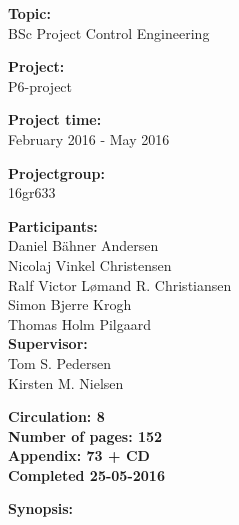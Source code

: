 \begin{minipage}[t]{0.48\textwidth}
\textbf{Topic:} \\[5pt]\bigskip\hspace{2ex}BSc Project Control Engineering 

\textbf{Project:} \\[5pt]\bigskip\hspace{2ex}
P6-project

\textbf{Project time:} \\[5pt]\bigskip\hspace{2ex}
February 2016 - May 2016

\textbf{Projectgroup:} \\[5pt]\bigskip\hspace{2ex}
16gr633	

\textbf{Participants:} \\[5pt]\hspace*{2ex}
Daniel Bähner Andersen \\\hspace*{2ex}
Nicolaj Vinkel Christensen \\\hspace*{2ex}
Ralf Victor Lømand R. Christiansen\\\hspace*{2ex}
Simon Bjerre Krogh \\\hspace*{2ex}
Thomas Holm Pilgaard \\

\textbf{Supervisor:} \\[5pt]\hspace*{2ex}
Tom S. Pedersen \\\hspace*{2ex}
Kirsten M. Nielsen \\\bigskip\hspace{2ex}

\vspace*{3.5cm}

\textbf{Circulation: 8} \\
\textbf{Number of pages: 152}\\
\textbf{Appendix: 73 + CD} \\
\textbf{Completed 25-05-2016}\\
\end{minipage}
\hfill
\begin{minipage}[t]{0.483\textwidth}
\textbf{Synopsis:} \\[5pt]
\fbox{\parbox{7cm}{\bigskip\bigskip}}
\end{minipage}

\vfill

